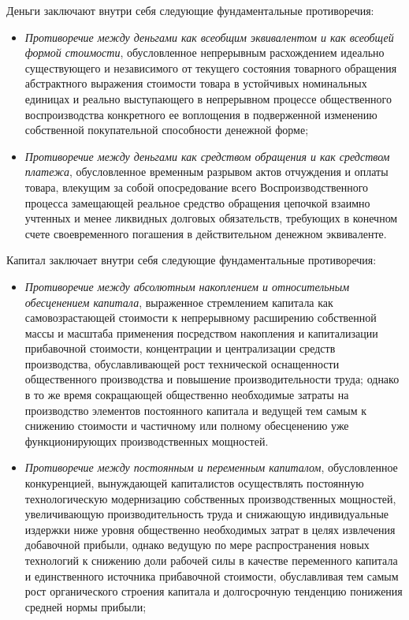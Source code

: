 Деньги заключают внутри себя следующие фундаментальные противоречия:
\begin{itemize}
    \item \textit{Противоречие между деньгами как всеобщим эквивалентом и как всеобщей формой стоимости}, обусловленное непрерывным расхождением идеально существующего и независимого от текущего состояния товарного обращения абстрактного выражения стоимости товара в устойчивых номинальных единицах и реально выступающего в непрерывном процессе общественного воспроизводства конкретного ее воплощения в подверженной изменению собственной покупательной способности денежной форме;
    \item \textit{Противоречие между деньгами как средством обращения и как средством платежа}, обусловленное временным разрывом актов отчуждения и оплаты товара, влекущим за собой опосредование всего Воспроизводственного процесса замещающей реальное средство обращения цепочкой взаимно учтенных и менее ликвидных долговых обязательств, требующих в конечном счете своевременного погашения в действительном денежном эквиваленте.
\end{itemize}

Капитал заключает внутри себя следующие фундаментальные противоречия:
\begin{itemize}
    \item \textit{Противоречие между абсолютным накоплением и относительным обесценением капитала}, выраженное стремлением капитала как самовозрастающей стоимости к непрерывному расширению собственной массы и масштаба применения посредством накопления и капитализации прибавочной стоимости, концентрации и централизации средств производства, обуславливающей рост технической оснащенности общественного производства и повышение производительности труда; однако в то же время сокращающей общественно необходимые затраты на производство элементов постоянного капитала и ведущей тем самым к снижению стоимости и частичному или полному обесценению уже функционирующих производственных мощностей.
    \item \textit{Противоречие между постоянным и переменным капиталом}, обусловленное конкуренцией, вынуждающей капиталистов осуществлять постоянную технологическую модернизацию собственных производственных мощностей, увеличивающую производительность труда и снижающую индивидуальные издержки ниже уровня общественно необходимых затрат в целях извлечения добавочной прибыли, однако ведущую по мере распространения новых технологий к снижению доли рабочей силы в качестве переменного капитала и единственного источника прибавочной стоимости, обуславливая тем самым рост органического строения капитала и долгосрочную тенденцию понижения средней нормы прибыли;
\end{itemize}

